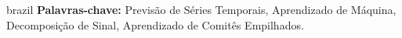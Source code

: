 \begin{resumo}[Resumo]
\begin{otherlanguage*}{brazil}
\vspace{3mm}
\noindent \textbf{Palavras-chave:} Previs\~ao de S\'eries Temporais, Aprendizado de M\'aquina, Decomposi\c{c}\~ao de Sinal, Aprendizado de Comit\^es Empilhados. 
 
\end{otherlanguage*}
\end{resumo}